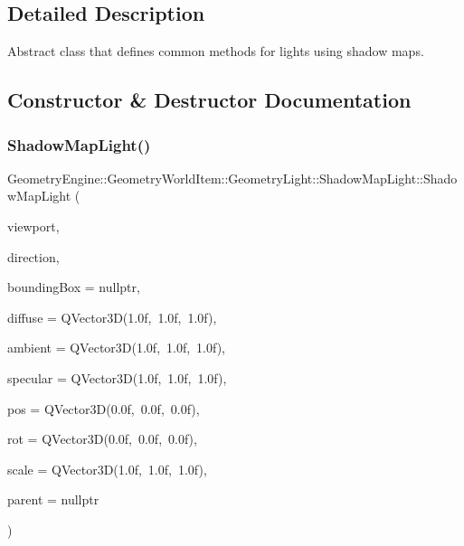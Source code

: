 \subsection{Detailed Description}
Abstract class that defines common methods for lights using shadow maps. 

\subsection{Constructor \& Destructor Documentation}
\mbox{\label{class_geometry_engine_1_1_geometry_world_item_1_1_geometry_light_1_1_shadow_map_light_adea3c877b7843389e52c351e5e4d5a75}} 
\subsubsection{\texorpdfstring{ShadowMapLight()}{ShadowMapLight()}\hspace{0.1cm}{\footnotesize\ttfamily [1/2]}}
{\footnotesize\ttfamily Geometry\+Engine\+::\+Geometry\+World\+Item\+::\+Geometry\+Light\+::\+Shadow\+Map\+Light\+::\+Shadow\+Map\+Light (\begin{DoxyParamCaption}\item[{const \mbox{\hyperlink{class_geometry_engine_1_1_geometry_item_utils_1_1_viewport}{Geometry\+Item\+Utils\+::\+Viewport}} \&}]{viewport,  }\item[{const Q\+Vector3D \&}]{direction,  }\item[{\mbox{\hyperlink{class_geometry_engine_1_1_geometry_world_item_1_1_geometry_item_1_1_geometry_item}{Geometry\+Item\+::\+Geometry\+Item}} $\ast$}]{bounding\+Box = {\ttfamily nullptr},  }\item[{const Q\+Vector3D \&}]{diffuse = {\ttfamily QVector3D(1.0f,~1.0f,~1.0f)},  }\item[{const Q\+Vector3D \&}]{ambient = {\ttfamily QVector3D(1.0f,~1.0f,~1.0f)},  }\item[{const Q\+Vector3D \&}]{specular = {\ttfamily QVector3D(1.0f,~1.0f,~1.0f)},  }\item[{const Q\+Vector3D \&}]{pos = {\ttfamily QVector3D(0.0f,~0.0f,~0.0f)},  }\item[{const Q\+Vector3D \&}]{rot = {\ttfamily QVector3D(0.0f,~0.0f,~0.0f)},  }\item[{const Q\+Vector3D \&}]{scale = {\ttfamily QVector3D(1.0f,~1.0f,~1.0f)},  }\item[{\mbox{\hyperlink{class_geometry_engine_1_1_geometry_world_item_1_1_world_item}{World\+Item}} $\ast$}]{parent = {\ttfamily nullptr} }\end{DoxyParamCaption})}

